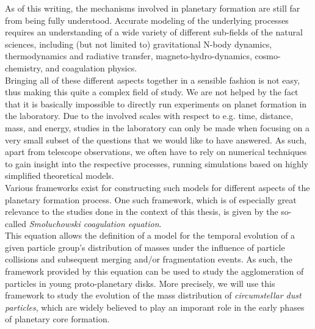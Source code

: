 
As of this writing, the mechanisms involved in planetary formation are still far from being fully 
understood. Accurate modeling of the underlying processes requires an understanding of a wide 
variety of different sub-fields of the natural sciences, 
including (but not limited to)
gravitational N-body dynamics,
thermodynamics and radiative transfer,
magneto-hydro-dynamics,
cosmo-chemistry, and 
coagulation physics. \\

Bringing all of these different aspects %
together in a sensible fashion is not easy,
thus making this quite a complex field of study. 
We are not helped by the fact that it is basically impossible to directly run experiments 
on planet formation in the laboratory. Due to the involved scales with respect to e.g. 
time, distance, mass, and energy,
studies in the laboratory can only be made when focusing on a very small subset of the 
questions that we would like to have answered.
As such, apart from telescope observations, we often have to rely on numerical techniques to gain 
insight into the respective processes, running simulations based on highly simplified theoretical 
models. \\

Various frameworks exist for constructing such models for different aspects of the planetary 
formation process. One such framework, which is of especially great relevance to the studies done 
in the context of this thesis, is given by the so-called 
\textit{Smoluchowski coagulation equation}. \\

This equation allows the definition of a model for the temporal evolution of a given particle 
group's distribution of masses under the influence of particle collisions and subsequent 
merging and/or fragmentation events. 
As such, the framework provided by this equation can be used to study the agglomeration of
particles in young proto-planetary disks. More precisely, we will use this framework to study the 
evolution of the mass distribution of \textit{circumstellar dust particles},
which are widely believed to play an imporant role in the early phases of planetary core 
formation. \\

